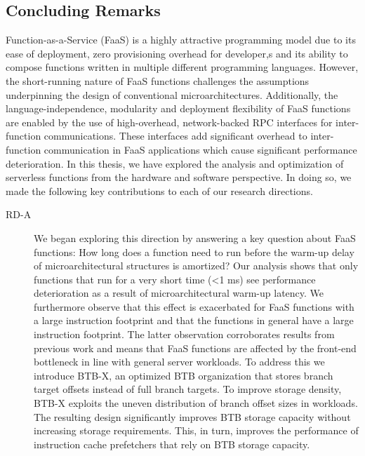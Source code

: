 \documentclass[../main.tex]{subfiles}
\begin{document}
\ifx\chapincluded\undefined
  \begin{refsection}
 \fi

\chapter{Concluding Remarks}
\label{chap:conclusions}
Function-as-a-Service (FaaS) is a highly attractive programming model
due to its ease of deployment, zero provisioning overhead for
developer,s and its ability to compose functions written in multiple
different programming languages. However, the short-running nature of
FaaS functions challenges the assumptions underpinning the design of
conventional microarchitectures. Additionally, the
language-independence, modularity and deployment flexibility of FaaS
functions are enabled by the use of high-overhead, network-backed RPC
interfaces for inter-function communications. These interfaces add
significant overhead to inter-function communication in FaaS
applications which cause significant performance deterioration. In
this thesis, we have explored the analysis and optimization of
serverless functions from the hardware and software perspective. In
doing so, we made the following key contributions to each of our
research directions.

\begin{description}


\item[RD-A] We began exploring this direction by answering a key
  question about FaaS functions: How long does a function need to run
  before the warm-up delay of microarchitectural structures is
  amortized? Our analysis shows that only functions that run for a very
  short time (<1 ms) see performance deterioration as a result of
  microarchitectural warm-up latency. We furthermore observe that this
  effect is exacerbated for FaaS functions with a large instruction
  footprint and that the functions in general have a large instruction
  footprint. The latter observation corroborates results from previous
  work and means that FaaS functions are affected by the front-end
  bottleneck in line with general server workloads. To address this we
  introduce BTB-X, an optimized BTB organization that stores branch
  target offsets instead of full branch targets. To improve storage
  density, BTB-X exploits the uneven distribution of branch offset
  sizes in workloads. The resulting design significantly improves BTB
  storage capacity without increasing storage requirements. This, in
  turn, improves the performance of instruction cache prefetchers that
  rely on BTB storage capacity.


\end{description}
\end{refsection}
\end{document}
